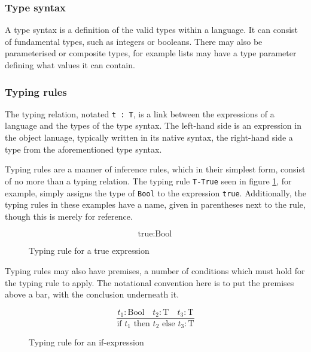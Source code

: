 \documentclass[nofilelist]{cslthse-msc}
\begin{document}
\subsubsection{Type syntax}
A type syntax is a definition of the valid types within a language.
It can consist of fundamental types, such as integers or booleans.
There may also be parameterised or composite types, for example lists may have a type parameter defining what values it can contain.

\subsubsection{Typing rules}
The typing relation, notated \lstinline{t : T}, is a link between the expressions of a language and the types of the type syntax.
The left-hand side is an expression in the object lanuage, typically written in its native syntax, the right-hand side a type from the aforementioned type syntax.

Typing rules are a manner of inference rules, which in their simplest form, consist of no more than a typing relation.
The typing rule \lstinline{T-True} seen in figure \ref{typingruleexampletrue}, for example, simply assigns the type of \lstinline{Bool} to the expression \lstinline{true}.
Additionally, the typing rules in these examples have a name, given in parentheses next to the rule, though this is merely for reference.

\begin{figure}[h]
  \begin{equation}
    \tag{T-True}
    \text{true} : \text{Bool}
  \end{equation}
  \caption{Typing rule for a true expression}
  \label{typingruleexampletrue}
\end{figure}

Typing rules may also have premises, a number of conditions which must hold for the typing rule to apply.
The notational convention here is to put the premises above a bar, with the conclusion underneath it.

\begin{figure}[h]
  \begin{equation}
    \tag{T-If}
    \frac{
      t_1 : \text{Bool}\quad
      t_2 : \text{T}\quad
      t_3 : \text{T}
    }{
      \text{if } t_1 \text{ then } t_2 \text{ else } t_3 : \text{T}
    }
  \end{equation}
  \caption{Typing rule for an if-expression}
  \label{typingruleexampleif}
\end{figure}
\end{document}
